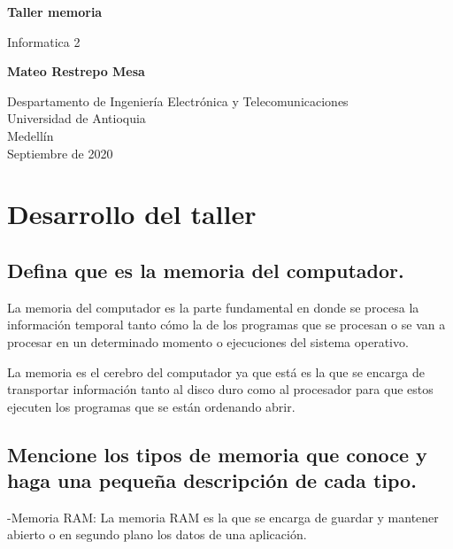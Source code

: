 \documentclass{article}
\begin{document}
\begin{titlepage}
    \begin{center}
        \vspace*{1cm}
            
        \Huge
        \textbf{Taller memoria}
            
        \vspace{0.5cm}
        \LARGE
        Informatica 2
            
        \vspace{1.5cm}
            
        \textbf{ Mateo Restrepo Mesa }
            
        \vfill
            
        \vspace{0.8cm}
            
        \Large
        Despartamento de Ingeniería Electrónica y Telecomunicaciones\\
        Universidad de Antioquia\\
        Medellín\\
        Septiembre de 2020
            
    \end{center}
\end{titlepage}


\section{Desarrollo del taller} \label{contenido}

\subsection{Defina que es la memoria del computador.}
La memoria del computador es la parte fundamental en donde se procesa la información temporal tanto cómo la de los programas que se procesan o se van a procesar en un determinado momento o ejecuciones del sistema operativo.

La memoria es el cerebro del computador ya que está es la que se encarga de transportar información tanto al disco duro como al procesador para que estos ejecuten los programas que se están ordenando abrir.

\subsection{Mencione los tipos de memoria que conoce y haga una pequeña descripción de cada tipo.}
-Memoria RAM: La memoria RAM es la que se encarga de guardar y mantener abierto o en segundo plano los datos de una aplicación.\newline
\end{document}
